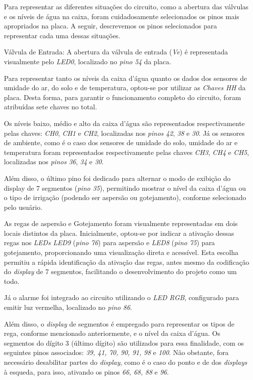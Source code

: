 \documentclass[
	article,			%
	11pt,				%
	oneside,			%
	a4paper,			%
	english,			%
	brazil,				%
	sumario=tradicional
	]{abntex2}
\begin{document}
Para representar as diferentes situações do circuito, como a abertura das válvulas e os níveis de água na caixa, foram cuidadosamente selecionados os pinos mais apropriados na placa. 
A seguir, descrevemos os pinos selecionados para representar cada uma dessas situações.

Válvula de Entrada: A abertura da válvula de entrada (\textit{Ve}) é representada visualmente pelo \textit{LED0}, localizado no \textit{pino 54} da placa.

Para representar tanto os níveis da caixa d’água quanto os dados dos sensores de umidade do ar, do solo e de temperatura, optou-se por utilizar as \textit{Chaves HH} da placa. 
Desta forma, para garantir o funcionamento completo do circuito, foram atribuídas sete chaves no total.

Os níveis baixo, médio e alto da caixa d’água são representados respectivamente pelas chaves: \textit{CH0}, \textit{CH1} e \textit{CH2}, localizadas nos \textit{pinos 42}, \textit{38} e \textit{30}.
Já os sensores de ambiente, como é o caso dos sensores de umidade do solo, umidade do ar e temperatura foram representados respectivamente pelas chaves \textit{CH3}, \textit{CH4} e \textit{CH5}, localizadas nos \textit{pinos 36}, \textit{34} e \textit{30}.

Além disso, o último pino foi dedicado para alternar o modo de exibição do display de 7 segmentos (\textit{pino 35}), permitindo mostrar o nível da caixa d’água ou o tipo de irrigação (podendo ser aspersão ou gotejamento), conforme selecionado pelo usuário.

As regas de aspersão e Gotejamento foram visualmente representadas em dois locais distintos da placa. 
Inicialmente, optou-se por indicar a ativação dessas regas nos \textit{LEDs LED9} (\textit{pino 76}) para aspersão e \textit{LED8} (\textit{pino 75}) para gotejamento, proporcionando uma visualização direta e acessível. 
Esta escolha permitiu a rápida identificação da ativação das regas, antes mesmo da codificação do \textit{display} de 7 segmentos, facilitando o desenvolvimento do projeto como um todo.

Já o alarme foi integrado ao circuito utilizando o \textit{LED RGB}, configurado para emitir luz vermelha, localizado no \textit{pino 86}.

Além disso, o \textit{display} de segmentos é empregado para representar os tipos de rega, conforme mencionado anteriormente, e o nível da caixa d'água. 
Os segmentos do dígito 3 (último dígito) são utilizados para essa finalidade, com os seguintes pinos associados: \textit{39, 41, 70, 90, 91, 98} e \textit{100}. Não obstante, fora necessário desabilitar partes do \textit{display}, como é o caso do ponto e de dos \textit{displays} à esqueda, para isso, ativando os pinos \textit{66, 68, 88} e \textit{96}.
\end{document}
